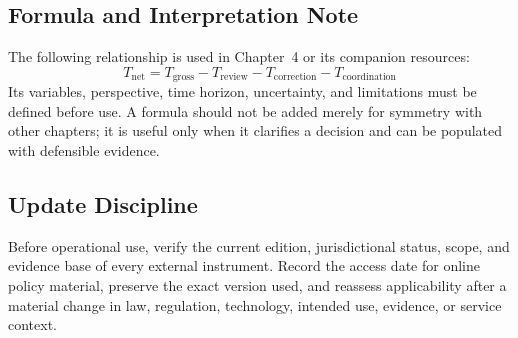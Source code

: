 \subsection{Formula and Interpretation Note}
The following relationship is used in Chapter~4 or its companion resources:
\begin{equation}
T_{\mathrm{net}}=T_{\mathrm{gross}}-T_{\mathrm{review}}-T_{\mathrm{correction}}-T_{\mathrm{coordination}}
\label{eq:comp-ch04-reference-formula}
\end{equation}
Its variables, perspective, time horizon, uncertainty, and limitations must be
defined before use. A formula should not be added merely for symmetry with other
chapters; it is useful only when it clarifies a decision and can be populated with
defensible evidence.

\subsection{Update Discipline}
Before operational use, verify the current edition, jurisdictional status, scope,
and evidence base of every external instrument. Record the access date for online
policy material, preserve the exact version used, and reassess applicability after a
material change in law, regulation, technology, intended use, evidence, or service
context.
